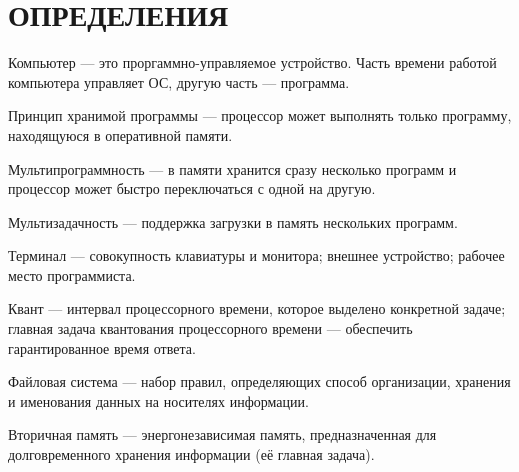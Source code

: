 \section*{ОПРЕДЕЛЕНИЯ}

Компьютер --- это проргаммно-управляемое устройство.
Часть времени работой компьютера управляет ОС, другую часть --- программа.


Принцип хранимой программы --- процессор может выполнять только программу, находящуюся в оперативной памяти.

Мультипрограммность --- в памяти хранится сразу несколько программ и процессор может быстро переключаться с одной на другую.

Мультизадачность --- поддержка загрузки в память нескольких программ.

Терминал --- совокупность клавиатуры и монитора; внешнее устройство; рабочее место программиста.

Квант --- интервал процессорного времени, которое выделено конкретной задаче; главная задача квантования процессорного времени --- обеспечить гарантированное время ответа.

Файловая система --- набор правил, определяющих способ организации, хранения и именования данных на носителях информации.

Вторичная память --- энергонезависимая память, предназначенная для долговременного хранения информации (её главная задача).

